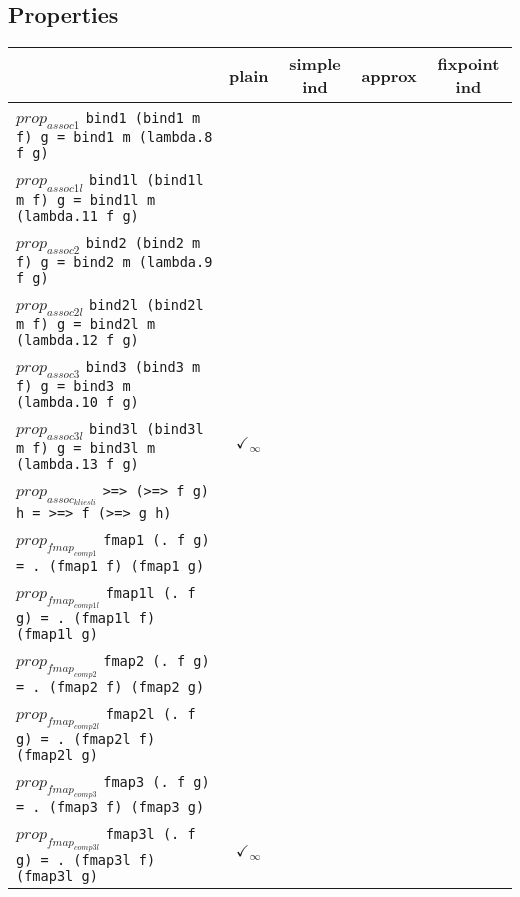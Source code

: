 \documentclass{article}
\begin{document}
\subsection*{Properties}
\begin{longtable}{p{10cm} || c | c | c | c | }
  & plain & simple ind & approx & fixpoint ind \\
\hline
$prop_{assoc1}$ \newline \verb`bind1 (bind1 m f) g = bind1 m (lambda.8 f g)` &  &  &  &  \\
\hline
$prop_{assoc1l}$ \newline \verb`bind1l (bind1l m f) g = bind1l m (lambda.11 f g)` &  &  &  &  \\
\hline
$prop_{assoc2}$ \newline \verb`bind2 (bind2 m f) g = bind2 m (lambda.9 f g)` &  &  &  &  \\
\hline
$prop_{assoc2l}$ \newline \verb`bind2l (bind2l m f) g = bind2l m (lambda.12 f g)` &  &  &  &  \\
\hline
$prop_{assoc3}$ \newline \verb`bind3 (bind3 m f) g = bind3 m (lambda.10 f g)` &  &  &  &  \\
\hline
$prop_{assoc3l}$ \newline \verb`bind3l (bind3l m f) g = bind3l m (lambda.13 f g)` & $\checkmark_{\infty}$ &  &  &  \\
\hline
$prop_{assoc_{kliesli}}$ \newline \verb`>=> (>=> f g) h = >=> f (>=> g h)` &  &  &  &  \\
\hline
$prop_{fmap_{comp1}}$ \newline \verb`fmap1 (. f g) = . (fmap1 f) (fmap1 g)` &  &  &  &  \\
\hline
$prop_{fmap_{comp1l}}$ \newline \verb`fmap1l (. f g) = . (fmap1l f) (fmap1l g)` &  &  &  &  \\
\hline
$prop_{fmap_{comp2}}$ \newline \verb`fmap2 (. f g) = . (fmap2 f) (fmap2 g)` &  &  &  &  \\
\hline
$prop_{fmap_{comp2l}}$ \newline \verb`fmap2l (. f g) = . (fmap2l f) (fmap2l g)` &  &  &  &  \\
\hline
$prop_{fmap_{comp3}}$ \newline \verb`fmap3 (. f g) = . (fmap3 f) (fmap3 g)` &  &  &  &  \\
\hline
$prop_{fmap_{comp3l}}$ \newline \verb`fmap3l (. f g) = . (fmap3l f) (fmap3l g)` & $\checkmark_{\infty}$ &  &  &  \\

\end{longtable}
\end{document}
